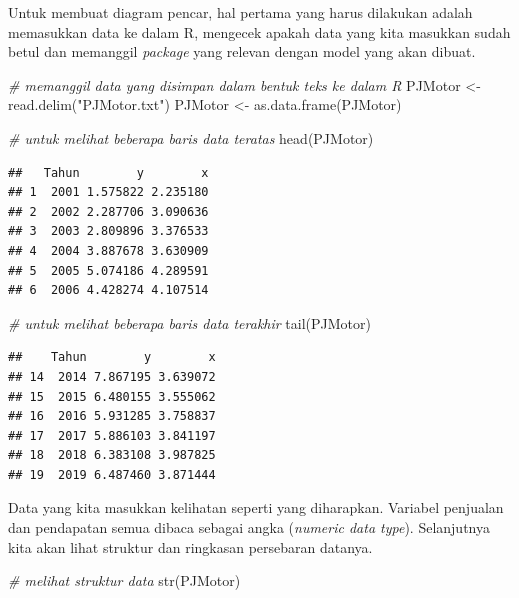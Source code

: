 \documentclass[
]{book}
\newenvironment{Shaded}{\begin{snugshade}}{\end{snugshade}}
\newcommand{\CommentTok}[1]{\textcolor[rgb]{0.56,0.35,0.01}{\textit{#1}}}
\newcommand{\FunctionTok}[1]{\textcolor[rgb]{0.00,0.00,0.00}{#1}}
\newcommand{\NormalTok}[1]{#1}
\newcommand{\OtherTok}[1]{\textcolor[rgb]{0.56,0.35,0.01}{#1}}
\newcommand{\StringTok}[1]{\textcolor[rgb]{0.31,0.60,0.02}{#1}}
\begin{document}
Untuk membuat diagram pencar, hal pertama yang harus dilakukan adalah memasukkan data ke dalam R, mengecek apakah data yang kita masukkan sudah betul dan memanggil \emph{package} yang relevan dengan model yang akan dibuat.

\begin{Shaded}
\begin{Highlighting}[]
\CommentTok{\# memanggil data yang disimpan dalam bentuk teks ke dalam R}
\NormalTok{PJMotor }\OtherTok{\textless{}{-}} \FunctionTok{read.delim}\NormalTok{(}\StringTok{"PJMotor.txt"}\NormalTok{) }
\NormalTok{PJMotor }\OtherTok{\textless{}{-}} \FunctionTok{as.data.frame}\NormalTok{(PJMotor)}
\end{Highlighting}
\end{Shaded}

\begin{Shaded}
\begin{Highlighting}[]
\CommentTok{\# untuk melihat beberapa baris data teratas}
\FunctionTok{head}\NormalTok{(PJMotor) }
\end{Highlighting}
\end{Shaded}

\begin{verbatim}
##   Tahun        y        x
## 1  2001 1.575822 2.235180
## 2  2002 2.287706 3.090636
## 3  2003 2.809896 3.376533
## 4  2004 3.887678 3.630909
## 5  2005 5.074186 4.289591
## 6  2006 4.428274 4.107514
\end{verbatim}

\begin{Shaded}
\begin{Highlighting}[]
\CommentTok{\# untuk melihat beberapa baris data terakhir}
\FunctionTok{tail}\NormalTok{(PJMotor) }
\end{Highlighting}
\end{Shaded}

\begin{verbatim}
##    Tahun        y        x
## 14  2014 7.867195 3.639072
## 15  2015 6.480155 3.555062
## 16  2016 5.931285 3.758837
## 17  2017 5.886103 3.841197
## 18  2018 6.383108 3.987825
## 19  2019 6.487460 3.871444
\end{verbatim}

Data yang kita masukkan kelihatan seperti yang diharapkan. Variabel penjualan dan pendapatan semua dibaca sebagai angka (\emph{numeric data type}). Selanjutnya kita akan lihat struktur dan ringkasan persebaran datanya.

\begin{Shaded}
\begin{Highlighting}[]
\CommentTok{\# melihat struktur data}
\FunctionTok{str}\NormalTok{(PJMotor)}
\end{Highlighting}
\end{Shaded}
\end{document}
